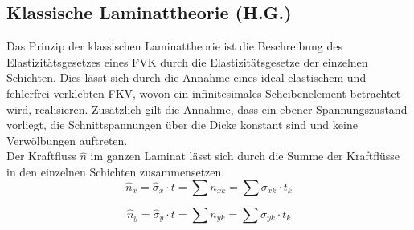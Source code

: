 \subsection{Klassische Laminattheorie (H.G.)}
Das Prinzip der klassischen Laminattheorie ist die Beschreibung des Elastizitätsgesetzes eines FVK durch die Elastizitätsgesetze der einzelnen Schichten. Dies lässt sich durch die Annahme eines ideal elastischem und fehlerfrei verklebten FKV, wovon ein infinitesimales Scheibenelement betrachtet wird, realisieren. Zusätzlich gilt die Annahme, dass ein ebener Spannungszustand vorliegt, die Schnittspannungen über die Dicke konstant sind und keine Verwölbungen auftreten.\\
\noindent
Der Kraftfluss $\hat{n}$ im ganzen Laminat lässt sich durch die Summe der Kraftflüsse in den einzelnen Schichten zusammensetzen.
\begin{equation}
\label{Kraftfluss}
\hat{n}_{x}=\hat{\sigma}_{x}\cdot t=\sum n_{xk}=\sum\sigma_{xk}\cdot t_{k}
\end{equation}

\begin{equation}
\hat{n}_{y}=\hat{\sigma}_{y}\cdot t=\sum n_{yk}=\sum\sigma_{yk}\cdot t_{k}
\end{equation}

